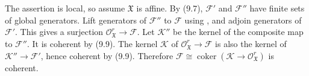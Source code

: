 The assertion is local, so assume $\mathfrak X$ is affine. By (9.7), $\mathcal F'$ and $\mathcal F''$ have finite sets of global generators. Lift generators of $\mathcal F''$ to $\mathcal F$ using , and adjoin generators of $\mathcal F'$. This gives a surjection $\mathcal O_{\mathfrak X}^r\to\mathcal F$. Let $\mathcal K''$ be the kernel of the composite map to $\mathcal F''$. It is coherent by (9.9). The kernel $\mathcal K$ of $\mathcal O_{\mathfrak X}^r\to\mathcal F$ is also the kernel of $\mathcal K''\to\mathcal F'$, hence coherent by (9.9). Therefore $\mathcal F\cong\operatorname{coker}(\mathcal K\to\mathcal O_{\mathfrak X}^r)$ is coherent.
